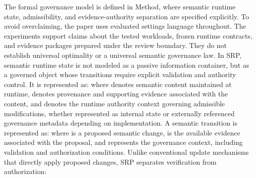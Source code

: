 {}The formal governance model is defined in Method, where semantic runtime state, admissibility, and evidence-authority separation are specified explicitly.\markdownRendererInterblockSeparator
{}
\markdownRendererSectionEnd \markdownRendererSectionBegin
{}\markdownRendererInterblockSeparator
{}To avoid overclaiming, the paper uses evaluated settings language throughout. The experiments support claims about the tested workloads, frozen runtime contracts, and evidence packages prepared under the review boundary. They do not establish universal optimality or a universal semantic governance law.\markdownRendererInterblockSeparator
{}
\markdownRendererSectionEnd 
\markdownRendererSectionEnd \markdownRendererSectionBegin
{}\markdownRendererInterblockSeparator
{}\markdownRendererSectionBegin
{}\markdownRendererInterblockSeparator
{}In SRP, semantic runtime state is not modeled as a passive information container, but as a governed object whose transitions require explicit validation and authority control. It is represented as:\markdownRendererInterblockSeparator
{}\markdownRendererInterblockSeparator
{}where  denotes semantic content maintained at runtime,  denotes provenance and supporting evidence associated with the content, and  denotes the runtime authority context governing admissible modifications, whether represented as internal state or externally referenced governance metadata depending on implementation.\markdownRendererParagraphSeparator
{}A semantic transition is represented as:\markdownRendererInterblockSeparator
{}\markdownRendererInterblockSeparator
{}where  is a proposed semantic change,  is the available evidence associated with the proposal, and  represents the governance context, including validation and authorization conditions.\markdownRendererParagraphSeparator
{}Unlike conventional update mechanisms that directly apply proposed changes, SRP separates verification from authorization:\markdownRendererInterblockSeparator
